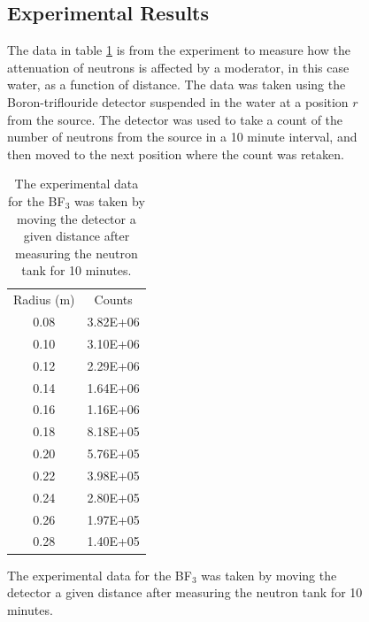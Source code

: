\begin{figure}[ht]
\subsection{Experimental Results} %
\label{sub:bf3experimental_results}
The data in table \ref{tab:bf3results} is from the experiment to measure how the attenuation of neutrons is affected by a moderator, in this case water, as a function of distance. The data was taken using the Boron-triflouride detector suspended in the water at a position $r$ from the source. The detector was used to take a count of the number of neutrons from the source in a 10 minute interval, and then moved to the next position where the count was retaken.
\begin{table}[ht]
  \centering
  \begin{tabular}{c|c}
  Radius (m)  &   Counts   \\
  0.08        &   3.82E+06 \\
  0.10        &   3.10E+06 \\
  0.12        &   2.29E+06 \\
  0.14        &   1.64E+06 \\
  0.16        &   1.16E+06 \\
  0.18        &   8.18E+05 \\
  0.20        &   5.76E+05 \\
  0.22        &   3.98E+05 \\
  0.24        &   2.80E+05 \\
  0.26        &   1.97E+05 \\
  0.28        &   1.40E+05 \\  
  \end{tabular}
  \caption{The experimental data for the BF$_3$ was taken by moving the detector a given distance after measuring the neutron tank for 10 minutes.\label{tab:bf3results}}
\end{table}


\end{figure}
